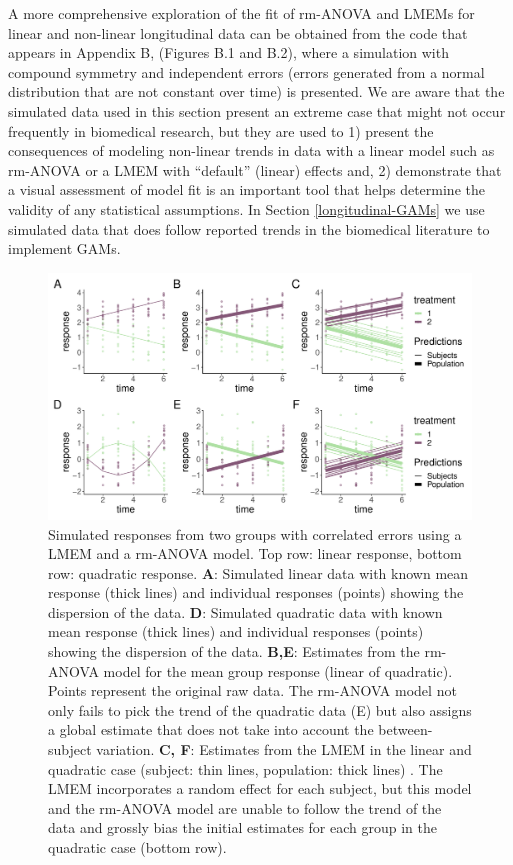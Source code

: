 \documentclass[
]{article}
\begin{document}
A more comprehensive exploration of the fit of rm-ANOVA and LMEMs for linear and non-linear longitudinal data can be obtained from the code that appears in Appendix B, (Figures B.1 and B.2), where a simulation with compound symmetry and independent errors (errors generated from a normal distribution that are not constant over time) is presented. We are aware that the simulated data used in this section present an extreme case that might not occur frequently in biomedical research, but they are used to 1) present the consequences of modeling non-linear trends in data with a linear model such as rm-ANOVA or a LMEM with ``default'' (linear) effects and, 2) demonstrate that a visual assessment of model fit is an important tool that helps determine the validity of any statistical assumptions. In Section \ref{longitudinal-GAMs} we use simulated data that does follow reported trends in the biomedical literature to implement GAMs.



\begin{figure}

{\centering \includegraphics[width=1\linewidth]{Main_manuscript_files/figure-latex/l-q-response-1} 

}

\caption{Simulated responses from two groups with correlated errors using a LMEM and a rm-ANOVA model. Top row: linear response, bottom row: quadratic response. \textbf{A}: Simulated linear data with known mean response (thick lines) and individual responses (points) showing the dispersion of the data. \textbf{D}: Simulated quadratic data with known mean response (thick lines) and individual responses (points) showing the dispersion of the data. \textbf{B,E}: Estimates from the rm-ANOVA model for the mean group response (linear of quadratic). Points represent the original raw data. The rm-ANOVA model not only fails to pick the trend of the quadratic data (E) but also assigns a global estimate that does not take into account the between-subject variation. \textbf{C, F}: Estimates from the LMEM in the linear and quadratic case (subject: thin lines, population: thick lines) . The LMEM incorporates a random effect for each subject, but this model and the rm-ANOVA model are unable to follow the trend of the data and grossly bias the initial estimates for each group in the quadratic case (bottom row).}\label{fig:l-q-response}
\end{figure}
\end{document}
